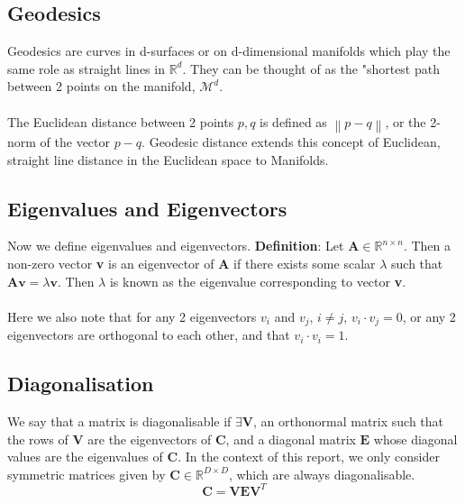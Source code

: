 \documentclass[12pt]{report}
\newcommand\norm[1]{\left\lVert#1\right\rVert}
\begin{document}
\subsection{Geodesics}

Geodesics are curves in d-surfaces or on d-dimensional manifolds
which play the same role as straight
lines in $\mathbb{R}^d$. They can be thought of as the "shortest path
between 2 points on the manifold, $\mathcal{M}^d$.\\
\\

The Euclidean distance between 2 points $p, q$ 
is defined as $\norm{p-q}$, or the 2-norm of the vector $p-q$.
Geodesic distance extends this concept of Euclidean, straight line distance
in the Euclidean space to Manifolds. 


\subsection{Eigenvalues and Eigenvectors}
Now we define eigenvalues and eigenvectors.
\textbf{Definition}: Let $\textbf{A} \in \mathbb{R}^{n \times n}$. 
Then a non-zero vector \textbf{v} is an eigenvector of \textbf{A} 
if there exists some scalar $\lambda$ such that $\textbf{A}\textbf{v} = \lambda \textbf{v}$. 
Then $\lambda$ is known as the eigenvalue corresponding to vector \textbf{v}.\\
\\
Here we also note that for any 2 eigenvectors $v_i$ and $v_j$, $i \neq j$, $v_i \cdot v_j = 0$, 
or any 2 eigenvectors are orthogonal to each other, and that $v_i \cdot v_i = 1$.

\subsection{Diagonalisation}

We say that a matrix is diagonalisable if $\exists \textbf{V}$, 
an orthonormal matrix such that the rows of \textbf{V} 
are the eigenvectors of \textbf{C},  and a diagonal matrix 
$\textbf{E}$ whose diagonal values are the eigenvalues of \textbf{C}.
In the context of this report, we only consider 
symmetric matrices given by $\textbf{C} \in \mathbb{R}^{D \times D}$, 
which are always diagonalisable.
$$\textbf{C} = \textbf{V}\textbf{E}\textbf{V}^T$$
\end{document}
